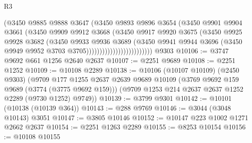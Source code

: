 \begin{lexlean}{R3}
\begin{coremodule}
                                    (@3450
                                      @9885
                                      @9888
                                      @3647
                                      (@3450
                                        @9893
                                        @9896
                                        @3654
                                        (@3450
                                          @9901
                                          @9904
                                          @3661
                                          (@3450
                                            @9909
                                            @9912
                                            @3668
                                            (@3450
                                              @9917
                                              @9920
                                              @3675
                                              (@3450
                                                @9925
                                                @9928
                                                @3682
                                                (@3450
                                                  @9933
                                                  @9936
                                                  @3689
                                                  (@3450
                                                    @9941
                                                    @9944
                                                    @3696
                                                    (@3450
                                                      @9949
                                                      @9952
                                                      @3703
                                                      @3705)))))))))))))))))))))))))
    @9303
@10106 := @3747 @9692 @661 @1256 @2640 @2637
@10107 := @2251 @9689
@10108 := @2251 @1252
@10109 := @10108 @2289
@10138 := @10106
    (@10107 @10109)
    (@2450 @9303)
    (@9709
      @177
      @1255
      @2637
      @2639
      @9689
      @10109
      (@3769 @9692 @159 @9689 (@3774 (@3775 @9692 @159)))
      (@9709 @1253 @214 @2637 @2637 @1252 @2289 (@9730 @1252) @9749))
@10139 := @3799 @9301
@10142 := @10101 (@10138 (@10139 @364))
@10143 := @288 @9769
@10146 := @3044 (@3048 @10143) @3051
@10147 := @3805 @10146
@10152 := @10147 @223 @1002 @1271 @2662 @2637
@10154 := @2251 @1263 @2289
@10155 := @8253 @10154
@10156 := @10108 @10155

\end{coremodule}
\end{lexlean}
